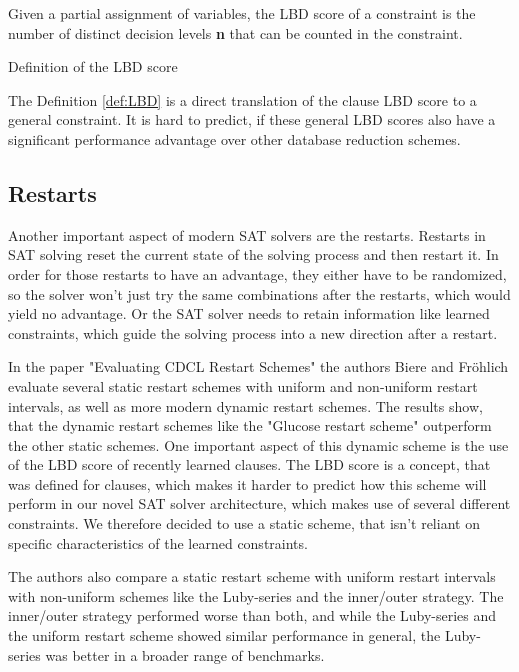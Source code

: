 \begin{definition}[!htb]
\begin{leftbar}
Given a partial assignment of variables, the LBD score of a constraint is the number of distinct decision levels \textbf{n} that can be counted in the constraint.
\end{leftbar}
\caption{Definition of the LBD score}
\label{def:LBD}
\end{definition}

The Definition \ref{def:LBD} is a direct translation of the clause LBD score to a general constraint. It is hard to predict, if these general LBD scores also have a significant performance advantage over other database reduction schemes.

\subsection{Restarts}

Another important aspect of modern SAT solvers are the restarts. Restarts in SAT solving reset the current state of the solving process and then restart it. In order for those restarts to have an advantage, they either have to be randomized, so the solver won't just try the same combinations after the restarts, which would yield no advantage. Or the SAT solver needs to retain information like learned constraints, which guide the solving process into a new direction after a restart.
\cite{biere2009handbook}

In the paper "Evaluating CDCL Restart Schemes" \cite{biere2015evaluatingRestarts} the authors Biere and Fröhlich evaluate several static restart schemes with uniform and non-uniform restart intervals, as well as more modern dynamic restart schemes. The results show, that the dynamic restart schemes like the "Glucose restart scheme" \cite{biere2015evaluatingRestarts} outperform the other static schemes. One important aspect of this dynamic scheme is the use of the LBD score of recently learned clauses. The LBD score is a concept, that was defined for clauses, which makes it harder to predict how this scheme will perform in our novel SAT solver architecture, which makes use of several different constraints. We therefore decided to use a static scheme, that isn't reliant on specific characteristics of the learned constraints.

The authors also compare a static restart scheme with uniform restart intervals with non-uniform schemes like the Luby-series and the inner/outer strategy. The inner/outer strategy performed worse than both, and while the Luby-series and the uniform restart scheme showed similar performance in general, the Luby-series was better in a broader range of benchmarks. \cite{biere2015evaluatingRestarts}

